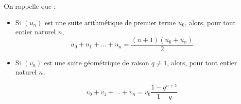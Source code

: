 On rappelle que :
\begin{itemize}
\item Si $(u_n)$ est une suite arithmétique de premier terme $u_0$, alors, pour tout entier naturel $n$,
\[u_0+ u_1+\dots+u_n=\dfrac{(n+1)(u_0+u_n)}{2}\]
 \item Si $(v_n)$ est une suite géométrique de raison $q\not= 1$, alors, pour tout entier naturel $n$,
 
\[v_0+v_1+\dots+v_n=v_0\dfrac{1-q^{n+1}}{1-q}\] 
\end{itemize}
